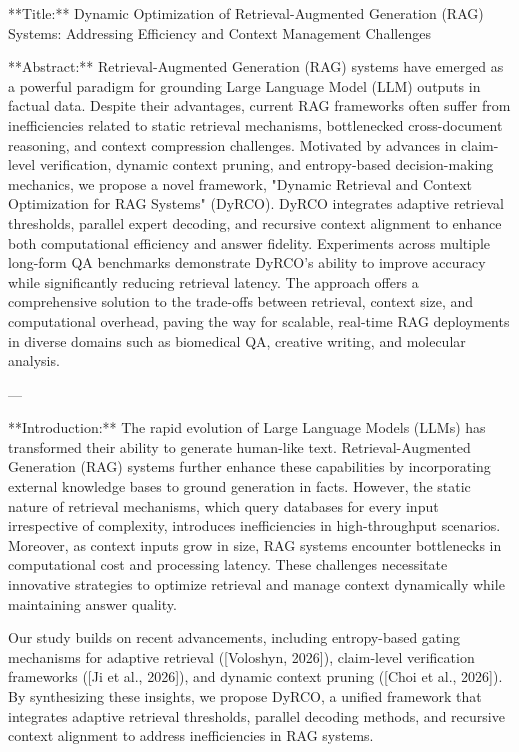 **Title:**  
Dynamic Optimization of Retrieval-Augmented Generation (RAG) Systems: Addressing Efficiency and Context Management Challenges  

**Abstract:**  
Retrieval-Augmented Generation (RAG) systems have emerged as a powerful paradigm for grounding Large Language Model (LLM) outputs in factual data. Despite their advantages, current RAG frameworks often suffer from inefficiencies related to static retrieval mechanisms, bottlenecked cross-document reasoning, and context compression challenges. Motivated by advances in claim-level verification, dynamic context pruning, and entropy-based decision-making mechanics, we propose a novel framework, "Dynamic Retrieval and Context Optimization for RAG Systems" (DyRCO). DyRCO integrates adaptive retrieval thresholds, parallel expert decoding, and recursive context alignment to enhance both computational efficiency and answer fidelity. Experiments across multiple long-form QA benchmarks demonstrate DyRCO's ability to improve accuracy while significantly reducing retrieval latency. The approach offers a comprehensive solution to the trade-offs between retrieval, context size, and computational overhead, paving the way for scalable, real-time RAG deployments in diverse domains such as biomedical QA, creative writing, and molecular analysis.  

---

**Introduction:**  
The rapid evolution of Large Language Models (LLMs) has transformed their ability to generate human-like text. Retrieval-Augmented Generation (RAG) systems further enhance these capabilities by incorporating external knowledge bases to ground generation in facts. However, the static nature of retrieval mechanisms, which query databases for every input irrespective of complexity, introduces inefficiencies in high-throughput scenarios. Moreover, as context inputs grow in size, RAG systems encounter bottlenecks in computational cost and processing latency. These challenges necessitate innovative strategies to optimize retrieval and manage context dynamically while maintaining answer quality.  

Our study builds on recent advancements, including entropy-based gating mechanisms for adaptive retrieval ([Voloshyn, 2026]), claim-level verification frameworks ([Ji et al., 2026]), and dynamic context pruning ([Choi et al., 2026]). By synthesizing these insights, we propose DyRCO, a unified framework that integrates adaptive retrieval thresholds, parallel decoding methods, and recursive context alignment to address inefficiencies in RAG systems.  

